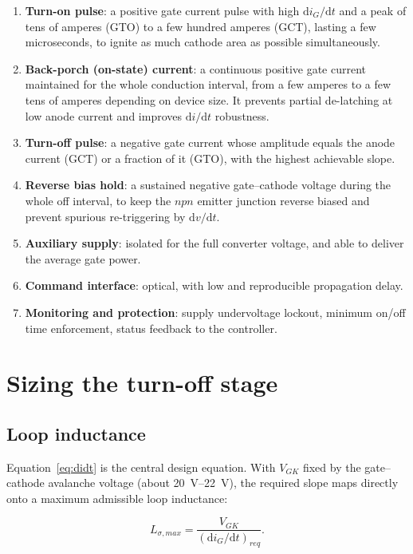 \documentclass[11pt,a4paper]{report}
\begin{document}
\begin{enumerate}[nosep]
  \item \textbf{Turn-on pulse}: a positive gate current pulse with high
        $\mathrm{d}i_{G}/\mathrm{d}t$ and a peak of tens of amperes (GTO) to a few
        hundred amperes (GCT), lasting a few microseconds, to ignite as much
        cathode area as possible simultaneously.
  \item \textbf{Back-porch (on-state) current}: a continuous positive gate
        current maintained for the whole conduction interval, from a few amperes
        to a few tens of amperes depending on device size. It prevents partial
        de-latching at low anode current and improves $\mathrm{d}i/\mathrm{d}t$
        robustness.
  \item \textbf{Turn-off pulse}: a negative gate current whose amplitude equals
        the anode current (GCT) or a fraction of it (GTO), with the highest
        achievable slope.
  \item \textbf{Reverse bias hold}: a sustained negative gate--cathode voltage
        during the whole off interval, to keep the $npn$ emitter junction
        reverse biased and prevent spurious re-triggering by $\mathrm{d}v/\mathrm{d}t$.
  \item \textbf{Auxiliary supply}: isolated for the full converter voltage, and
        able to deliver the average gate power.
  \item \textbf{Command interface}: optical, with low and reproducible
        propagation delay.
  \item \textbf{Monitoring and protection}: supply undervoltage lockout, minimum
        on/off time enforcement, status feedback to the controller.
\end{enumerate}

\section{Sizing the turn-off stage}

\subsection{Loop inductance}

Equation~\eqref{eq:didt} is the central design equation. With $V_{GK}$ fixed by
the gate--cathode avalanche voltage (about \SIrange{20}{22}{\volt}), the required
slope maps directly onto a maximum admissible loop inductance:

\begin{equation}
L_{\sigma,max} = \frac{V_{GK}}{\left(\mathrm{d}i_{G}/\mathrm{d}t\right)_{req}} .
\end{equation}
\end{document}
